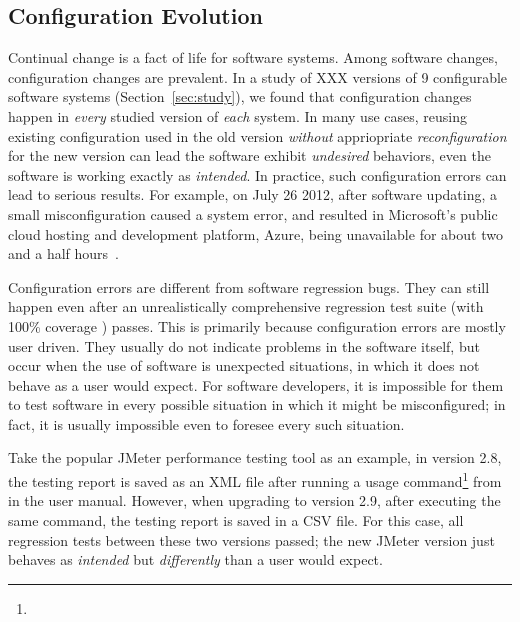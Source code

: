 \subsection{Configuration Evolution}
\label{sec:evolerror}

Continual change is a fact of life for software systems.
Among software changes, configuration changes are prevalent.
In a study of XXX versions of 9 configurable software
systems (Section~\ref{sec:study}),
we found that configuration changes happen in \textit{every} studied
version of \textit{each} system. In many use
cases, reusing existing configuration used in the old
version \textit{without} appriopriate
\textit{reconfiguration} for the new
version can lead the software exhibit \textit{undesired} behaviors,
even the software is working exactly as \textit{intended}.
In practice, such configuration errors can lead to serious results.
For example, on July 26 2012, after software updating,
a small misconfiguration caused a system error, and resulted in
Microsoft's public cloud hosting and development platform, Azure,
being unavailable for about two and a half hours~\cite{msdown}.


Configuration errors are different from software regression bugs.
They can still happen even after an unrealistically comprehensive
regression test suite (with 100\% coverage ) passes. This is primarily
because configuration errors are mostly user driven.
They usually do not indicate problems in the software itself, but
occur when the use of software is unexpected
situations, in which it does not behave as a user would expect.
For software developers,
it is impossible for them to test software in every possible
situation in which it might be misconfigured; in fact, it is usually
impossible even to foresee every such situation. 


Take the popular JMeter performance testing tool as an example, 
in version 2.8, the testing report is saved as an XML
file after running a usage command\footnote{} from in the user manual.
However, when upgrading to version 2.9, 
after executing the same command, the testing report is saved
in a CSV file. For this case, all regression tests between
these two versions passed; the new JMeter version
just behaves as \textit{intended} but \textit{differently}
than a user would expect.


